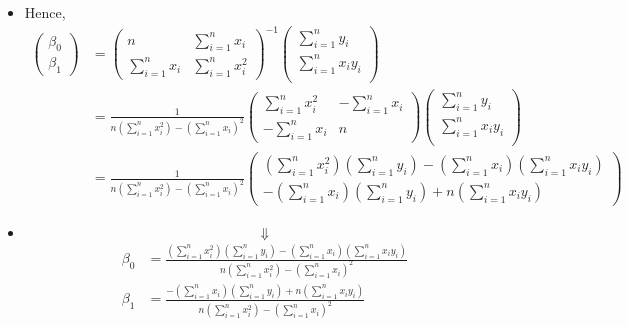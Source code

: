 \begin{frame}[fragile]
\small
\begin{itemize}
	\item[] Hence,
	\begin{align*}
		\begin{pmatrix} \beta_0\\ \beta_1 \end{pmatrix}
		& =
		\begin{pmatrix}
			n                & \sum_{i=1}^n x_i \\[1em]
			\sum_{i=1}^n x_i & \sum_{i=1}^n x_i^2
		\end{pmatrix}^{-1}
		\begin{pmatrix}
		\sum_{i=1}^n y_i\\[1em]
		\sum_{i=1}^n x_iy_i\\
		\end{pmatrix} \\[1em]
		&=
		\frac{1}{n(\sum_{i=1}^n x_i^2) - (\sum_{i=1}^n x_i)^2}
		\begin{pmatrix}
			\sum_{i=1}^n x_i^2 & -\sum_{i=1}^n x_i \\[1em]
			-\sum_{i=1}^n x_i  & n
		\end{pmatrix}
		\begin{pmatrix}
		\sum_{i=1}^n y_i\\[1em]
		\sum_{i=1}^n x_iy_i\\
		\end{pmatrix} \\[1em]
		&=
		\frac{1}{n(\sum_{i=1}^n x_i^2) - (\sum_{i=1}^n x_i)^2}
		\begin{pmatrix}
			\left(\sum_{i=1}^n x_i^2\right) \left(\sum_{i=1}^n y_i\right) - \left(\sum_{i=1}^n x_i\right) \left(\sum_{i=1}^n x_iy_i\right) \\[1em]
			-\left(\sum_{i=1}^n x_i\right) \left(\sum_{i=1}^n y_i\right) + n \left(\sum_{i=1}^n x_iy_i\right)
		\end{pmatrix}
	\end{align*}
		\item[]
		\[\Downarrow\]
		\begin{align*}
			\beta_0 & = \frac{\left(\sum_{i=1}^n x_i^2\right) \left(\sum_{i=1}^n y_i\right) - \left(\sum_{i=1}^n x_i\right) \left(\sum_{i=1}^n x_iy_i\right)}{n(\sum_{i=1}^n x_i^2) - (\sum_{i=1}^n x_i)^2}\\[1em]
			\beta_1 & = \frac{-\left(\sum_{i=1}^n x_i\right) \left(\sum_{i=1}^n y_i\right) + n \left(\sum_{i=1}^n x_iy_i\right)}{n(\sum_{i=1}^n x_i^2) - (\sum_{i=1}^n x_i)^2}
		\end{align*}
\end{itemize}
\end{frame}

